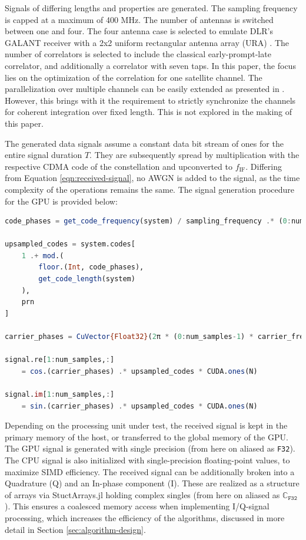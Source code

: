 \documentclass{juliacon}
\begin{document}
Signals of differing lengths and properties are generated. The sampling frequency is capped at a maximum of 400 MHz. The number of antennas is switched between one and four. The four antenna case is selected to emulate DLR's GALANT receiver with a 2x2 uniform rectangular antenna array (URA) \cite{Cuntz2009}. The number of correlators is selected to include the classical early-prompt-late correlator, and additionally a correlator with seven taps. In this paper, the focus lies on the optimization of the correlation for one satellite channel. The parallelization over multiple channels can be easily extended as presented in \cite{Xu2017}. However, this brings with it the requirement to strictly synchronize the channels for coherent integration over fixed length. This is not explored in the making of this paper.

The generated data signals assume a constant data bit stream of ones for the entire signal duration $T$. They are subsequently spread by multiplication with the respective CDMA code of the constellation and upconverted to $f_{\mathrm{IF}}$. Differing from Equation \ref{eqn:received-signal}, no AWGN is added to the signal, as the time complexity of the operations remains the same. The signal generation procedure for the GPU is provided below: 
\begin{lstlisting}[language = Julia]
code_phases = get_code_frequency(system) / sampling_frequency .* (0:num_samples-1) .+ start_code_phase

upsampled_codes = system.codes[
    1 .+ mod.(
        floor.(Int, code_phases),
        get_code_length(system)
    ),
    prn
]

carrier_phases = CuVector{Float32}(2π * (0:num_samples-1) * carrier_frequency / sampling_frequency .+ start_carrier_phase)

signal.re[1:num_samples,:] 
    = cos.(carrier_phases) .* upsampled_codes * CUDA.ones(N)

signal.im[1:num_samples,:] 
    = sin.(carrier_phases) .* upsampled_codes * CUDA.ones(N)
\end{lstlisting}
Depending on the processing unit under test, the received signal is kept in the primary memory of the host, or transferred to the global memory of the GPU. The GPU signal is generated with single precision (from here on aliased as \texttt{F32}). The CPU signal is also initialized with single-precision floating-point values, to maximize SIMD efficiency. The received signal can be additionally broken into a Quadrature (Q) and an In-phase component (I). These are realized as a structure of arrays via StuctArrays.jl holding complex singles (from here on aliased as $\mathbb{C}_{\texttt{F32}}$). This ensures a coalesced memory access when implementing I/Q-signal processing, which increases the efficiency of the algorithms, discussed in more detail in Section \ref{sec:algorithm-design}.
\end{document}
